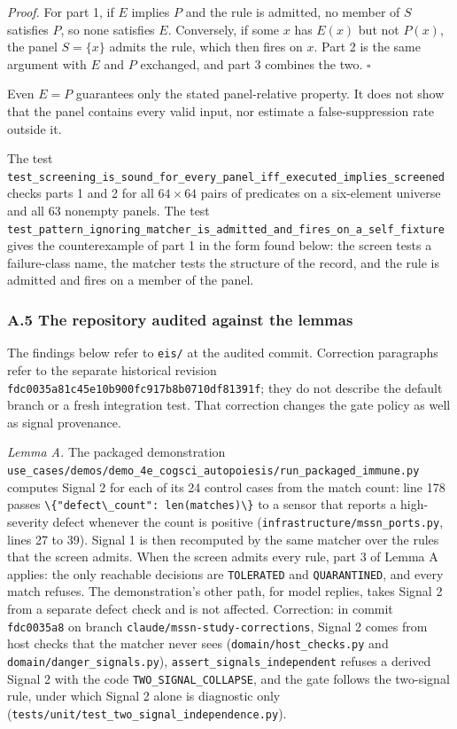 \documentclass[
  11pt,
]{article}
\newcommand{\passthrough}[1]{#1}
\begin{document}
\emph{Proof.} For part 1, if \(E\) implies \(P\) and the rule is
admitted, no member of \(S\) satisfies \(P\), so none satisfies \(E\).
Conversely, if some \(x\) has \(E(x)\) but not \(P(x)\), the panel
\(S = \{x\}\) admits the rule, which then fires on \(x\). Part 2 is the
same argument with \(E\) and \(P\) exchanged, and part 3 combines the
two. \(\square\)

Even \(E=P\) guarantees only the stated panel-relative property. It does
not show that the panel contains every valid input, nor estimate a
false-suppression rate outside it.

The test
\nolinkurl{test_screening_is_sound_for_every_panel_iff_executed_implies_screened}
checks parts 1 and 2 for all \(64 \times 64\) pairs of predicates on a
six-element universe and all 63 nonempty panels. The test
\nolinkurl{test_pattern_ignoring_matcher_is_admitted_and_fires_on_a_self_fixture}
gives the counterexample of part 1 in the form found below: the screen
tests a failure-class name, the matcher tests the structure of the
record, and the rule is admitted and fires on a member of the panel.

\subsubsection{A.5 The repository audited against the
lemmas}\label{a.5-the-repository-audited-against-the-lemmas}

The findings below refer to
\nolinkurl{eis/} at the audited commit.
Correction paragraphs refer to the separate historical revision
\nolinkurl{fdc0035a81c45e10b900fc917b8b0710df81391f}; they do not
describe the default branch or a fresh integration test. That correction
changes the gate policy as well as signal provenance.

\emph{Lemma A.} The packaged demonstration
\nolinkurl{use_cases/demos/demo_4e_cogsci_autopoiesis/run_packaged_immune.py}
computes Signal 2 for each of its 24 control cases from the match count:
line 178 passes
\passthrough{\lstinline!\{"defect\_count": len(matches)\}!} to a sensor
that reports a high-severity defect whenever the count is positive
(\nolinkurl{infrastructure/mssn_ports.py}, lines 27 to 39). Signal 1 is
then recomputed by the same matcher over the rules that the screen
admits. When the screen admits every rule, part 3 of Lemma A applies:
the only reachable decisions are \passthrough{\lstinline!TOLERATED!} and
\passthrough{\lstinline!QUARANTINED!}, and every match refuses. The
demonstration's other path, for model replies, takes Signal 2 from a
separate defect check and is not affected. Correction: in commit
\passthrough{\lstinline!fdc0035a8!} on branch
\nolinkurl{claude/mssn-study-corrections}, Signal 2 comes from host
checks that the matcher never sees (\nolinkurl{domain/host_checks.py}
and \nolinkurl{domain/danger_signals.py}),
\nolinkurl{assert_signals_independent} refuses a derived Signal 2 with
the code \nolinkurl{TWO_SIGNAL_COLLAPSE}, and the gate follows the
two-signal rule, under which Signal 2 alone is diagnostic only
(\nolinkurl{tests/unit/test_two_signal_independence.py}).
\end{document}
